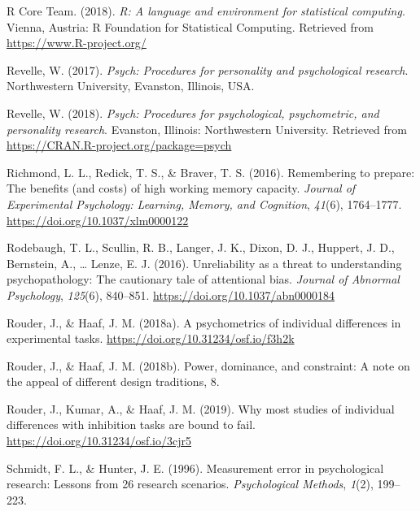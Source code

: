 \documentclass[english,,man,floatsintext]{apa6}
\begin{document}
\leavevmode\hypertarget{ref-R-base}{}%
R Core Team. (2018). \emph{R: A language and environment for statistical computing}. Vienna, Austria: R Foundation for Statistical Computing. Retrieved from \url{https://www.R-project.org/}

\leavevmode\hypertarget{ref-revelle_w_psych:_2017}{}%
Revelle, W. (2017). \emph{Psych: Procedures for personality and psychological research}. Northwestern University, Evanston, Illinois, USA.

\leavevmode\hypertarget{ref-R-psych}{}%
Revelle, W. (2018). \emph{Psych: Procedures for psychological, psychometric, and personality research}. Evanston, Illinois: Northwestern University. Retrieved from \url{https://CRAN.R-project.org/package=psych}

\leavevmode\hypertarget{ref-richmond_remembering_2016}{}%
Richmond, L. L., Redick, T. S., \& Braver, T. S. (2016). Remembering to prepare: The benefits (and costs) of high working memory capacity. \emph{Journal of Experimental Psychology: Learning, Memory, and Cognition}, \emph{41}(6), 1764--1777. \url{https://doi.org/10.1037/xlm0000122}

\leavevmode\hypertarget{ref-rodebaugh_unreliability_2016}{}%
Rodebaugh, T. L., Scullin, R. B., Langer, J. K., Dixon, D. J., Huppert, J. D., Bernstein, A., \ldots{} Lenze, E. J. (2016). Unreliability as a threat to understanding psychopathology: The cautionary tale of attentional bias. \emph{Journal of Abnormal Psychology}, \emph{125}(6), 840--851. \url{https://doi.org/10.1037/abn0000184}

\leavevmode\hypertarget{ref-rouder_psychometrics_2018}{}%
Rouder, J., \& Haaf, J. M. (2018a). A psychometrics of individual differences in experimental tasks. \url{https://doi.org/10.31234/osf.io/f3h2k}

\leavevmode\hypertarget{ref-rouder_power_2018}{}%
Rouder, J., \& Haaf, J. M. (2018b). Power, dominance, and constraint: A note on the appeal of different design traditions, 8.

\leavevmode\hypertarget{ref-rouder_why_2019}{}%
Rouder, J., Kumar, A., \& Haaf, J. M. (2019). Why most studies of individual differences with inhibition tasks are bound to fail. \url{https://doi.org/10.31234/osf.io/3cjr5}

\leavevmode\hypertarget{ref-schmidt_measurement_1996}{}%
Schmidt, F. L., \& Hunter, J. E. (1996). Measurement error in psychological research: Lessons from 26 research scenarios. \emph{Psychological Methods}, \emph{1}(2), 199--223.
\end{document}
